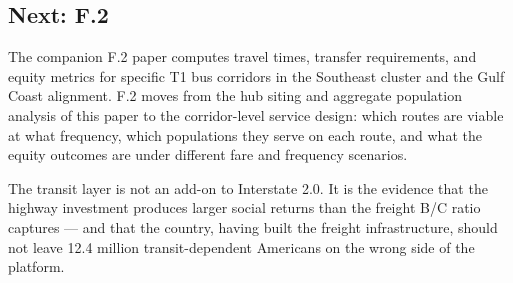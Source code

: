 \subsection{Next: F.2}

The companion F.2 paper computes travel times, transfer requirements, and equity metrics for specific T1 bus corridors in the Southeast cluster and the Gulf Coast alignment. F.2 moves from the hub siting and aggregate population analysis of this paper to the corridor-level service design: which routes are viable at what frequency, which populations they serve on each route, and what the equity outcomes are under different fare and frequency scenarios.

The transit layer is not an add-on to Interstate 2.0. It is the evidence that the highway investment produces larger social returns than the freight B/C ratio captures --- and that the country, having built the freight infrastructure, should not leave 12.4 million transit-dependent Americans on the wrong side of the platform.
